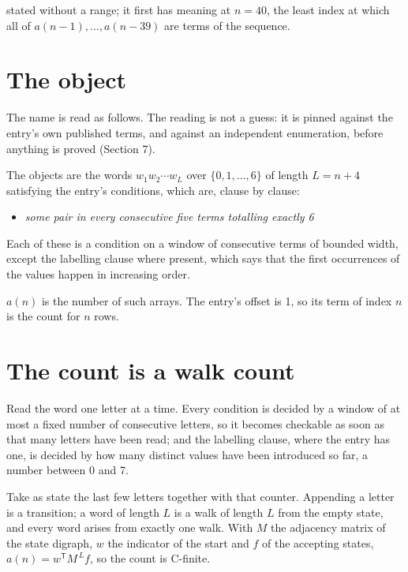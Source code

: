 \documentclass[11pt]{article}
\theoremstyle{definition}
\begin{document}
stated without a range; it first has meaning at $n = 40$, the least index at which all of $a(n-1),\dots,a(n-39)$ are terms of the sequence.

\section{The object}

The name is read as follows. The reading is not a guess: it is pinned against the entry's own published terms, and against an independent enumeration, before anything is proved (Section 7).

The objects are the words $w_1 w_2 \cdots w_L$ over $\{0,1,\dots,6\}$ of length $L = n + 4$ satisfying the entry's conditions, which are, clause by clause:

\begin{itemize}

\item {\itshape some pair in every consecutive five terms totalling exactly 6}

\end{itemize}

Each of these is a condition on a window of consecutive terms of bounded width, except the labelling clause where present, which says that the first occurrences of the values happen in increasing order.

$a(n)$ is the number of such arrays. The entry's offset is 1, so its term of index $n$ is the count for $n$ rows.

\section{The count is a walk count}

Read the word one letter at a time. Every condition is decided by a window of at most a fixed number of consecutive letters, so it becomes checkable as soon as that many letters have been read; and the labelling clause, where the entry has one, is decided by how many distinct values have been introduced so far, a number between $0$ and 7.

Take as state the last few letters together with that counter. Appending a letter is a transition; a word of length $L$ is a walk of length $L$ from the empty state, and every word arises from exactly one walk. With $M$ the adjacency matrix of the state digraph, $w$ the indicator of the start and $f$ of the accepting states, $a(n) = w^{\mathsf T}M^{\,L}f$, so the count is C-finite.
\end{document}
